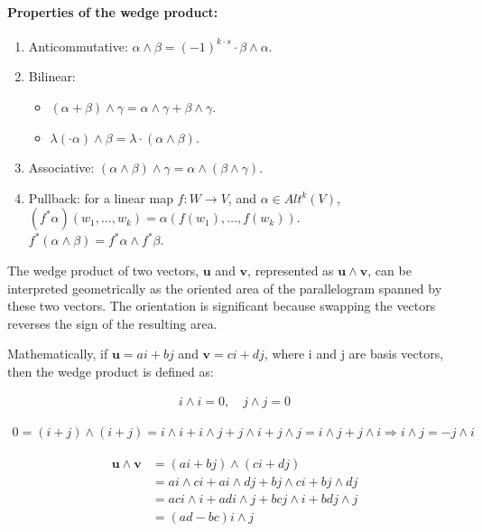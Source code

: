 \documentclass[11pt]{book} %
\begin{document}
\paragraph{Properties of the wedge product:}
\begin{enumerate}
    \item Anticommutative: $\alpha \wedge \beta = (-1)^{k \cdot s} \cdot \beta \wedge \alpha$.
    \item Bilinear:
        \begin{itemize}
            \item $(\alpha + \beta) \wedge \gamma = \alpha \wedge \gamma + \beta \wedge \gamma$.
            \item $\lambda (\cdot \alpha) \wedge \beta = \lambda \cdot (\alpha \wedge \beta)$.
        \end{itemize}
    \item Associative: $(\alpha \wedge \beta) \wedge \gamma = \alpha \wedge (\beta \wedge \gamma)$.
    \item Pullback: for a linear map $f : W \to V$, and $\alpha \in Alt^k(V)$, $(f^* \alpha)(w_1, \ldots, w_k) = \alpha(f(w_1), \ldots, f(w_k))$. \\
        $f^*(\alpha \wedge \beta) = f^* \alpha \wedge f^* \beta$.
\end{enumerate}


The wedge product of two vectors, \(\mathbf{u}\) and \(\mathbf{v}\), represented as \(\mathbf{u} \wedge \mathbf{v}\), 
can be interpreted geometrically as the oriented area of the parallelogram spanned by these two vectors. 
The orientation is significant because swapping the vectors reverses the sign of the resulting area.

Mathematically, if \(\mathbf{u} = ai + bj\) and \(\mathbf{v} = ci + dj\), where i and j are basis vectors, then the wedge product is defined as:

\begin{align*}
    i \wedge i = 0, \quad j \wedge j = 0
\end{align*}

\begin{align*}
    0 = (i + j) \wedge (i + j) = i \wedge i + i \wedge j + j \wedge i + j \wedge j = i \wedge j + j \wedge i \Rightarrow i \wedge j = -j \wedge i
\end{align*}

\begin{align*}
\mathbf{u} \wedge \mathbf{v} &= (ai + bj) \wedge (ci + dj) \\
&= ai \wedge ci + ai \wedge dj + bj \wedge ci + bj \wedge dj \\
&= ac i \wedge i + ad i \wedge j + bc j \wedge i + bd j \wedge j \\
&= (ad - bc) i \wedge j
\end{align*}
\end{document}
